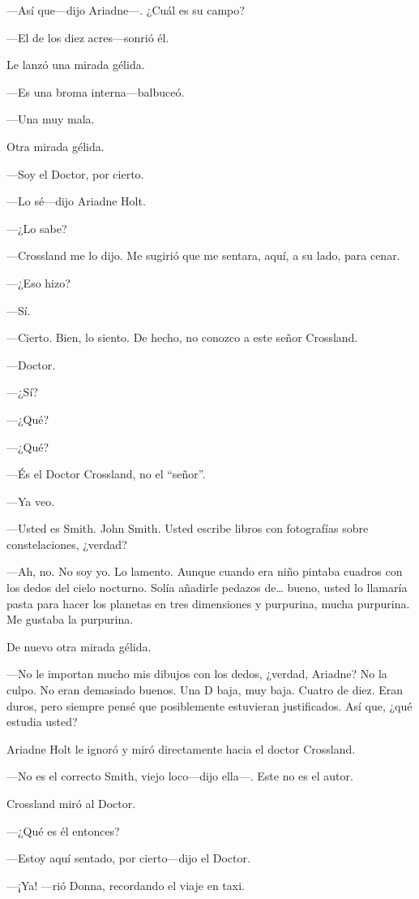 ---Así que---dijo Ariadne---. ¿Cuál es su campo?

---El de los diez acres---sonrió él.

Le lanzó una mirada gélida.

---Es una broma interna---balbuceó.

---Una muy mala.

Otra mirada gélida.

---Soy el Doctor, por cierto.

---Lo sé---dijo Ariadne Holt.

---¿Lo sabe?

---Crossland me lo dijo. Me sugirió que me sentara, aquí, a su lado,
para cenar.

---¿Eso hizo?

---Sí.

---Cierto. Bien, lo siento. De hecho, no conozco a este señor Crossland.

---Doctor.

---¿Sí?

---¿Qué?

---¿Qué?

---És el Doctor Crossland, no el ``señor''.

---Ya veo.

---Usted es Smith. John Smith. Usted escribe libros con fotografías
sobre constelaciones, ¿verdad?

---Ah, no. No soy yo. Lo lamento. Aunque cuando era niño pintaba cuadros
con los dedos del cielo nocturno. Solía añadirle pedazos de\ldots{}
bueno, usted lo llamaría pasta para hacer los planetas en tres
dimensiones y purpurina, mucha purpurina. Me gustaba la purpurina.

De nuevo otra mirada gélida.

---No le importan mucho mis dibujos con los dedos, ¿verdad, Ariadne? No
la culpo. No eran demasiado buenos. Una D baja, muy baja. Cuatro de
diez. Eran duros, pero siempre pensé que posiblemente estuvieran
justificados. Así que, ¿qué estudia usted?

Ariadne Holt le ignoró y miró directamente hacia el doctor Crossland.

---No es el correcto Smith, viejo loco---dijo ella---. Este no es el
autor.

Crossland miró al Doctor.

---¿Qué es él entonces?

---Estoy aquí sentado, por cierto---dijo el Doctor.

---¡Ya! ---rió Donna, recordando el viaje en taxi.


